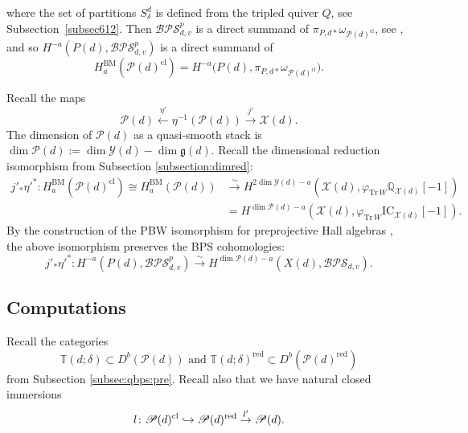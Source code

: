\documentclass [11pt,oneside,a4paper,mathscr]{amsart}
\theoremstyle{definition}
\renewcommand{\leq}{\leqslant}
\newcommand{\X}{\mathscr{X}}
\begin{document}
where the set of partitions $S^d_{\delta}$ is defined from the tripled quiver $Q$, see Subsection~\ref{subsec612}.
Then $\mathcal{BPS}^p_{d,v}$ is a direct summand of $\pi_{P,d*}\omega_{\mathscr{P}(d)^{\mathrm{cl}}}$, see \cite[Theorem A]{D}, and so $H^{-a}(P(d), \mathcal{BPS}^p_{d,v})$ is a direct summand of \[H^{\mathrm{BM}}_a(\mathscr{P}(d)^{\mathrm{cl}})=H^{-a}\big(P(d), \pi_{P,d*}\omega_{\mathscr{P}(d)^{\mathrm{cl}}}\big).\] 

Recall the maps 
\[\mathscr{P}(d)\xleftarrow{\eta'}\eta^{-1}(\mathscr{P}(d))\xrightarrow{j'}\X(d).\]
The dimension of $\mathscr{P}(d)$ as a quasi-smooth stack is $\dim \mathscr{P}(d):=\dim \mathscr{Y}(d)-\dim \mathfrak{g}(d)$.
Recall the dimensional reduction isomorphism from Subsection \ref{subsection:dimred}:
\begin{align*}
j'_*\eta'^*\colon H^{\mathrm{BM}}_a(\mathscr{P}(d)^{\mathrm{cl}})\cong H^{\mathrm{BM}}_a(\mathscr{P}(d))&\xrightarrow{\sim} H^{2\dim\mathscr{Y}(d)-a}(\X(d), \varphi_{\mathrm{Tr}\,W}\mathbb{Q}_{\X(d)}[-1])\\ &=H^{\dim\mathscr{P}(d)-a}(\X(d), \varphi_{\mathrm{Tr}\,W}\mathrm{IC}_{\X(d)}[-1]).
\end{align*}
By the construction of the PBW isomorphism for preprojective Hall algebras \cite[Equation (31)]{D}, 
the above isomorphism preserves the BPS cohomologies:
\begin{equation}\label{BPSmatched}
j'_*\eta'^*\colon H^{-a}(P(d), \mathcal{BPS}^p_{d,v})\xrightarrow{\sim} H^{\dim\mathscr{P}(d)-a}(X(d), \mathcal{BPS}_{d,v}).
\end{equation}

\subsection{Computations}

Recall the categories 
\[\mathbb{T}(d; \delta)\subset D^b(\mathscr{P}(d))\text{ and }\mathbb{T}(d; \delta)^{\mathrm{red}}\subset D^b(\mathscr{P}(d)^{\mathrm{red}})\] from Subsection \ref{subsec:qbps:pre}. 
Recall also that 
we have natural closed immersions 
\begin{align*}
    l \colon \mathscr{P}(d)^{\rm{cl}} \hookrightarrow 
    \mathscr{P}(d)^{\rm{red}} \stackrel{l'}{\to} 
    \mathscr{P}(d). 
\end{align*}
\end{document}
